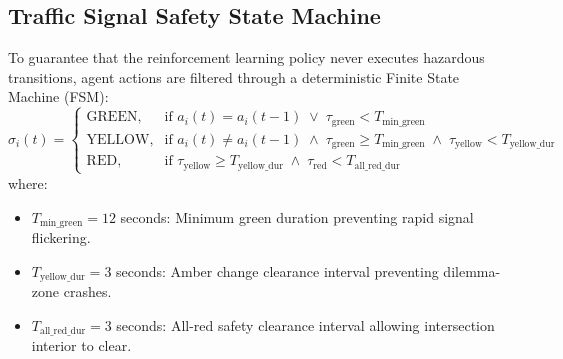 \documentclass[12pt,a4paper,oneside]{report}
\begin{document}
\subsection{Traffic Signal Safety State Machine}
To guarantee that the reinforcement learning policy never executes hazardous transitions, agent actions are filtered through a deterministic Finite State Machine (FSM):
\begin{equation}
\sigma_i(t) = 
\begin{cases}
\text{GREEN}, & \text{if } a_i(t) = a_i(t-1) \;\lor\; \tau_{\text{green}} < T_{\text{min\_green}} \\
\text{YELLOW}, & \text{if } a_i(t) \ne a_i(t-1) \;\land\; \tau_{\text{green}} \ge T_{\text{min\_green}} \;\land\; \tau_{\text{yellow}} < T_{\text{yellow\_dur}} \\
\text{RED}, & \text{if } \tau_{\text{yellow}} \ge T_{\text{yellow\_dur}} \;\land\; \tau_{\text{red}} < T_{\text{all\_red\_dur}}
\end{cases}
\end{equation}
where:
\begin{itemize}
    \item $T_{\text{min\_green}} = 12$ seconds: Minimum green duration preventing rapid signal flickering.
    \item $T_{\text{yellow\_dur}} = 3$ seconds: Amber change clearance interval preventing dilemma-zone crashes.
    \item $T_{\text{all\_red\_dur}} = 3$ seconds: All-red safety clearance interval allowing intersection interior to clear.
\end{itemize}
\end{document}
